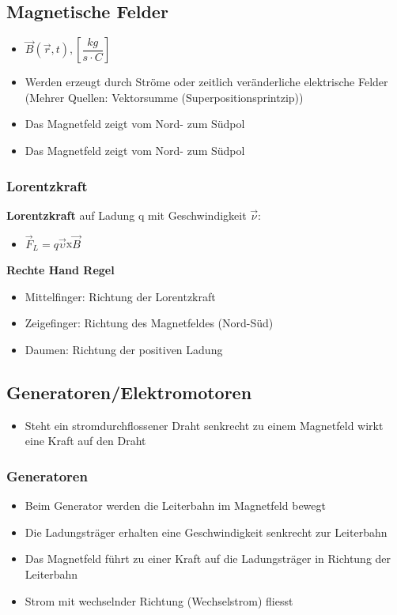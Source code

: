 \documentclass[8pt,a4paper]{scrartcl}
\begin{document}
\begin{multicols*}{3}
			\subsection{Magnetische Felder}
				\begin{itemize}\itemsep0pt
					\item $\overrightarrow{B}(\overrightarrow{r},t), [\dfrac{kg}{s\cdot C}]$
					\item Werden erzeugt durch Ströme oder zeitlich veränderliche elektrische Felder (Mehrer Quellen: Vektorsumme (Superpositionsprintzip))
					\item Das Magnetfeld zeigt vom Nord- zum Südpol
					\item Das Magnetfeld zeigt vom Nord- zum Südpol
				\end{itemize}
				
				\subsubsection{Lorentzkraft}				
				
					\textbf{Lorentzkraft} auf Ladung q mit Geschwindigkeit $\overrightarrow{\nu}$:
					\begin{itemize}\itemsep0pt
						\item $\overrightarrow{F}_{L}=q\overrightarrow{\upsilon} $x$ \overrightarrow{B}$
					\end{itemize}	
					
					\textbf{Rechte Hand Regel}
					\begin{itemize}\itemsep0pt
						\item Mittelfinger: Richtung der Lorentzkraft
						\item Zeigefinger: Richtung des Magnetfeldes (Nord-Süd)
						\item Daumen: Richtung der positiven Ladung
					\end{itemize}					
				
			\subsection{Generatoren/Elektromotoren}
				\begin{itemize}\itemsep0pt
					\item Steht ein stromdurchflossener Draht senkrecht zu einem Magnetfeld wirkt eine Kraft auf den Draht
				\end{itemize}	
			
					\subsubsection{Generatoren}
						\begin{itemize}\itemsep0pt
							\item Beim Generator werden die Leiterbahn im Magnetfeld bewegt
							\item Die Ladungsträger erhalten eine Geschwindigkeit senkrecht zur Leiterbahn
							\item Das Magnetfeld führt zu einer Kraft auf die Ladungsträger in Richtung der Leiterbahn
							\item Strom mit wechselnder Richtung (Wechselstrom) fliesst
						\end{itemize}

\end{multicols*}
\end{document}
